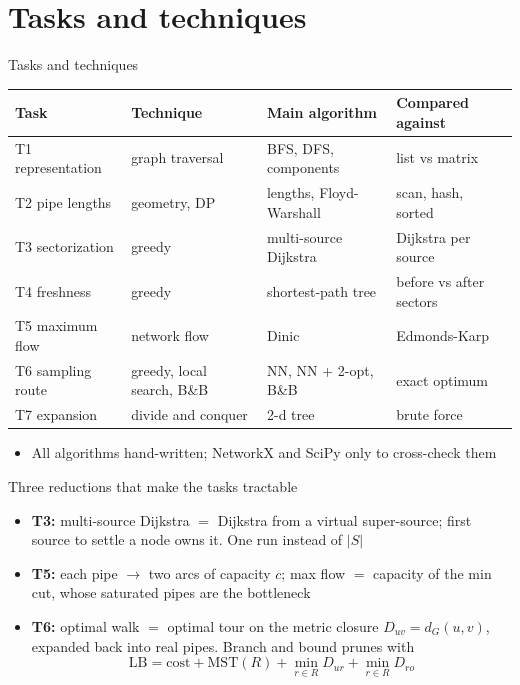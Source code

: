 \section{Tasks and techniques}
\begin{frame}{Tasks and techniques}
  \centering\footnotesize\setlength{\tabcolsep}{4pt}
  \begin{tabular}{llll}
    \toprule
    Task & Technique & Main algorithm & Compared against \\
    \midrule
    T1 representation & graph traversal & BFS, DFS, components & list vs matrix \\
    T2 pipe lengths & geometry, DP & lengths, Floyd-Warshall & scan, hash, sorted \\
    T3 sectorization & greedy & multi-source Dijkstra & Dijkstra per source \\
    T4 freshness & greedy & shortest-path tree & before vs after sectors \\
    T5 maximum flow & network flow & Dinic & Edmonds-Karp \\
    T6 sampling route & greedy, local search, B\&B & NN, NN + 2-opt, B\&B & exact optimum \\
    T7 expansion & divide and conquer & 2-d tree & brute force \\
    \bottomrule
  \end{tabular}
  \raggedright
  \vspace{0.6em}
  \begin{itemize}\small
    \item All algorithms hand-written; NetworkX and SciPy only to cross-check them
  \end{itemize}
\end{frame}

\begin{frame}{Three reductions that make the tasks tractable}
  \begin{itemize}
    \item \textbf{T3:} multi-source Dijkstra $=$ Dijkstra from a virtual super-source; first source to settle a node owns it. One run instead of $|S|$
    \item \textbf{T5:} each pipe $\to$ two arcs of capacity $c$; max flow $=$ capacity of the min cut, whose saturated pipes are the bottleneck
    \item \textbf{T6:} optimal walk $=$ optimal tour on the metric closure $D_{uv}=d_G(u,v)$, expanded back into real pipes. Branch and bound prunes with
    \[\mathrm{LB}=\mathrm{cost}+\mathrm{MST}(R)+\min_{r\in R}D_{ur}+\min_{r\in R}D_{ro}\]
  \end{itemize}
\end{frame}
